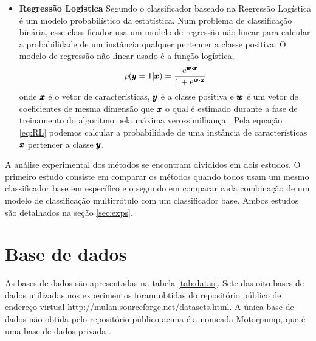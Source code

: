 \begin{itemize}
 \item \textbf{Regressão Logística}
 Segundo \cite{james2013introduction} o classificador baseado na Regressão Logística 
 é um modelo probabilístico da estatística. Num problema de classificação binária,
 esse classificador usa um modelo de regressão não-linear
 para calcular a probabilidade de um instância qualquer pertencer a classe positiva.
 O modelo de regressão não-linear usado é a função logística, 
 \begin{equation} \label{eq:RL}
  p({\pmb{y}}=1|{\pmb{x}}) = \frac{e^{{\pmb{w}} \cdot {\pmb{x}}}}{1+e^{{\pmb{w}} \cdot {\pmb{x}}}}
 \end{equation}
onde ${\pmb{x}}$ é o vetor de características, ${\pmb{y}}$ é a classe positiva e ${\pmb{w}}$ é um vetor de coeficientes de mesma dimensão
que ${\pmb{x}}$ o qual é estimado durante a fase de treinamento do algoritmo pela máxima verossimilhança \cite{james2013introduction}.
Pela equação \ref{eq:RL} podemos calcular a probabilidade de uma instância de características ${\pmb{x}}$ pertencer a classe ${\pmb{y}}$.
\end{itemize}


A análise experimental dos métodos se encontram divididos em dois estudos. O primeiro estudo consiste em
comparar os métodos quando todos usam um mesmo classificador base em específico
e o segundo em comparar cada combinação de um
modelo de classificação multirrótulo com um classificador base. 
Ambos estudos são detalhados na seção \ref{sec:exps}.





\section{Base de dados}
\label{sec:datas}
As bases de dados são apresentadas na tabela \ref{tab:datas}.
Sete das oito bases de dados utilizadas nos experimentos foram obtidas do repositório público
de endereço virtual http://mulan.sourceforge.net/datasets.html.
A única base de dados não obtida pelo repositório público acima é a nomeada Motorpump, que é uma
base de dados privada \cite{mendel2008}.



